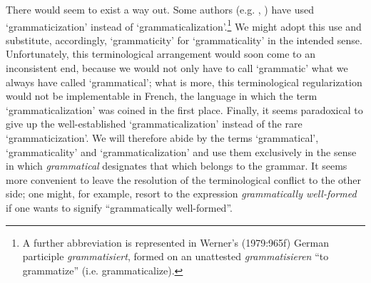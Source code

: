 There would seem to exist a way out. Some authors (e.g. \citet[49]{Givón1975}, \citet[489]{Bolinger1978}) have used ‘grammaticization’ instead of ‘grammaticalization’.\footnote{A further abbreviation is represented in Werner's (1979:965f) German participle \textit{grammatisiert}, formed on an unattested \textit{grammatisieren} “to grammatize” (i.e. grammaticalize).} We might adopt this use and substitute, accordingly, ‘grammaticity’ for ‘grammaticality’ in the intended sense. Unfortunately, this terminological arrangement would soon come to an inconsistent end, because we would not only have to call ‘grammatic’ what we always have called ‘grammatical’; what is more, this terminological regularization would not be implementable in French, the language in which the term ‘grammaticalization’ was coined in the first place. Finally, it seems paradoxical to give up the well-established ‘grammaticalization’ instead of the rare ‘grammaticization’. We will therefore abide by the terms ‘grammatical’, ‘grammaticality’ and ‘grammaticalization’ and use them exclusively in the sense in which \textit{grammatical} designates that which belongs to the grammar. It seems more convenient to leave the resolution of the terminological conflict to the other side; one might, for example, resort to the expression \textit{grammatically well-formed} if one wants to signify “grammatically well-formed”.

